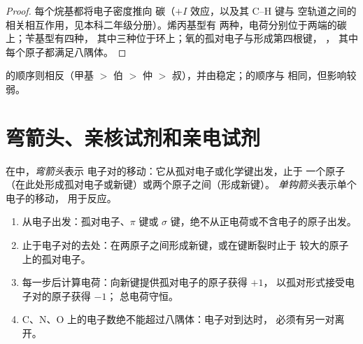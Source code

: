 \begin{proof}
每个烷基都将电子密度推向
碳（$+I$ 效应，以及其 C--H 键与
空轨道之间的相关相互作用，见本科二年级分册）。烯丙基型有
两种，电荷分别位于两端的碳上；苄基型有四种，
其中三种位于环上；氧的孤对电子与形成第四根键，
，
其中每个原子都满足八隅体。
\end{proof}

的顺序则相反（甲基 $>$ 伯 $>$ 仲
$>$ 叔），并由稳定；的顺序与
相同，但影响较弱。

\section{弯箭头、亲核试剂和亲电试剂}

\begin{definition}[弯箭头]\label{def:b1:electronic-effects:curly-arrow}
在中，\emph{弯箭头}表示
电子对的移动：它从孤对电子或化学键出发，止于
一个原子（在此处形成孤对电子或新键）或两个原子之间（形成新键）。
\emph{单钩箭头}表示单个电子的移动，
用于反应。
\end{definition}

\begin{method}[画弯箭头]\label{met:b1:electronic-effects:curly-arrows}
\begin{enumerate}
  \item 从电子出发：孤对电子、$\pi$ 键或 $\sigma$
        键，绝不从正电荷或不含电子的原子出发。
  \item 止于电子对的去处：在两原子之间形成新键，或在键断裂时止于
        较大的原子上的孤对电子。
  \item 每一步后计算电荷：向新键提供孤对电子的原子获得 $+1$，
        以孤对形式接受电子对的原子获得 $-1$；
        总电荷守恒。
  \item C、N、O 上的电子数绝不能超过八隅体：电子对到达时，
        必须有另一对离开。
\end{enumerate}
\end{method}

